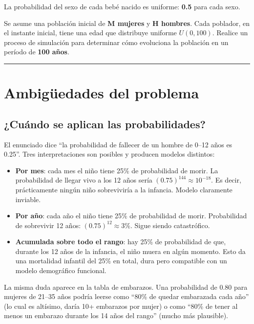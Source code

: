 \documentclass[12pt,a4paper]{article}
\begin{document}
La probabilidad del sexo de cada bebé nacido es uniforme: \textbf{0.5} para cada sexo.


Se asume una población inicial de \textbf{M mujeres} y \textbf{H hombres}. Cada poblador, en el instante inicial, tiene una edad que distribuye uniforme $U(0, 100)$. Realice un proceso de simulación para determinar cómo evoluciona la población en un período de \textbf{100 años}.

\begin{center}\rule{0.7\linewidth}{0.4pt}\end{center}

\section{Ambigüedades del problema}

\subsection{¿Cuándo se aplican las probabilidades?}

El enunciado dice ``la probabilidad de fallecer de un hombre de 0--12 años es 0.25''. Tres interpretaciones son posibles y producen modelos distintos:

\begin{itemize}
    \item \textbf{Por mes}: cada mes el niño tiene 25\% de probabilidad de morir. La probabilidad de llegar vivo a los 12 años sería $(0.75)^{144} \approx 10^{-18}$. Es decir, prácticamente ningún niño sobreviviría a la infancia. Modelo claramente inviable.
    \item \textbf{Por año}: cada año el niño tiene 25\% de probabilidad de morir. Probabilidad de sobrevivir 12 años: $(0.75)^{12} \approx 3\%$. Sigue siendo catastrófico.
    \item \textbf{Acumulada sobre todo el rango}: hay 25\% de probabilidad de que, durante los 12 años de la infancia, el niño muera en algún momento. Esto da una mortalidad infantil del 25\% en total, dura pero  compatible con un modelo demográfico funcional.
\end{itemize}

La misma duda aparece en la tabla de embarazos. Una probabilidad de 0.80 para mujeres de 21--35 años podría leerse como ``80\% de quedar embarazada cada año'' (lo cual es altísimo, daría 10+ embarazos por mujer) o como ``80\% de tener al menos un embarazo durante los 14 años del rango'' (mucho más plausible).
\end{document}
